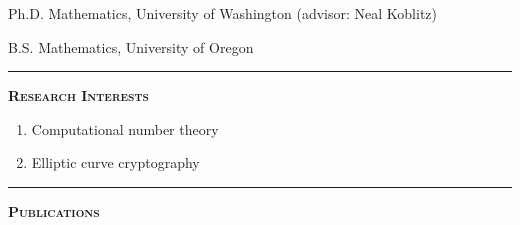 \documentclass[12pt]{article}
\newcommand{\sectionheading}[1]
{
\bigskip %
\noindent
\hspace{-6.5mm}\textcolor{Gray}{\rule[.75mm]{21.5mm}{1mm}} %
\hspace{.2mm}	%
{\large{\textbf{\textsc{#1}}}} %
}
\newenvironment{date_section}
	{
	\vspace{-1ex}
	\leftmargini = 15ex
		\begin{itemize}[
			labelsep = *,
			labelwidth = 9ex,
			labelindent = 0ex,
			itemindent = !,
			font=\normalfont,
			align=parleft
		]{}
		\itemsep=-1.5mm
	}
	{\end{itemize}\vspace{-2ex}}
\newcommand{\yearmo}[2]{
	\item[
		{\makebox[1ex][r]{#1}}
		\hspace{1ex}
		{\makebox[1ex][l]{#2} }
		] }
\begin{document}
		\begin{date_section}

			\yearmo{}{2018} Ph.D. Mathematics, University of Washington (advisor: Neal Koblitz)

			\yearmo{}{2013} %
			B.S. Mathematics, University of Oregon





		\end{date_section}




	\sectionheading{Research Interests}%

	\vspace*{-0.25cm}
	\begin{enumerate}[label=$\bullet$, itemsep=-1mm, leftmargin=24mm]
		\item Computational number theory
		\item Elliptic curve cryptography
	\end{enumerate}
	\vspace*{-0.5cm}








	\sectionheading{Publications}%
\end{document}
